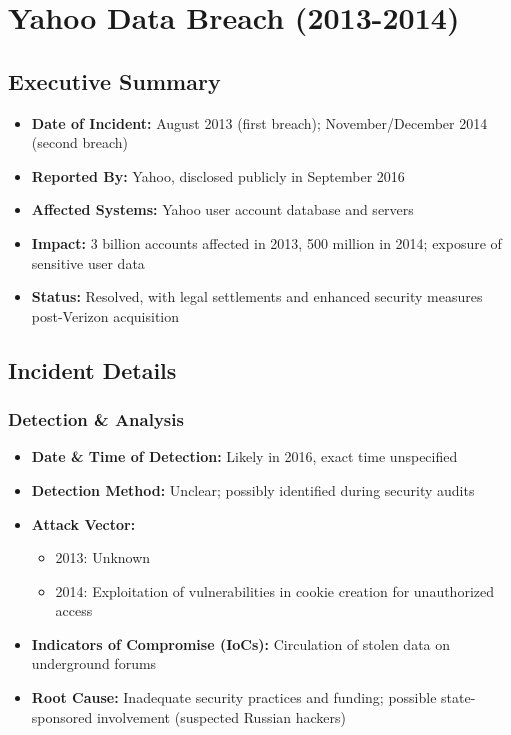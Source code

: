 \documentclass[11pt]{book}
\begin{document}
\clearpage
\tableofcontents
\clearpage

\chapter{Yahoo Data Breach (2013-2014)}
\section{Executive Summary}
\begin{itemize}
    \item \textbf{Date of Incident:} August 2013 (first breach); November/December 2014 (second breach)
    \item \textbf{Reported By:} Yahoo, disclosed publicly in September 2016
    \item \textbf{Affected Systems:} Yahoo user account database and servers
    \item \textbf{Impact:} 3 billion accounts affected in 2013, 500 million in 2014; exposure of sensitive user data
    \item \textbf{Status:} Resolved, with legal settlements and enhanced security measures post-Verizon acquisition
\end{itemize}

\section{Incident Details}
\subsection{Detection \& Analysis}
\begin{itemize}
    \item \textbf{Date \& Time of Detection:} Likely in 2016, exact time unspecified
    \item \textbf{Detection Method:} Unclear; possibly identified during security audits
    \item \textbf{Attack Vector:} 
    \begin{itemize}
        \item 2013: Unknown
        \item 2014: Exploitation of vulnerabilities in cookie creation for unauthorized access
    \end{itemize}
    \item \textbf{Indicators of Compromise (IoCs):} Circulation of stolen data on underground forums
    \item \textbf{Root Cause:} Inadequate security practices and funding; possible state-sponsored involvement (suspected Russian hackers)
\end{itemize}
\end{document}
